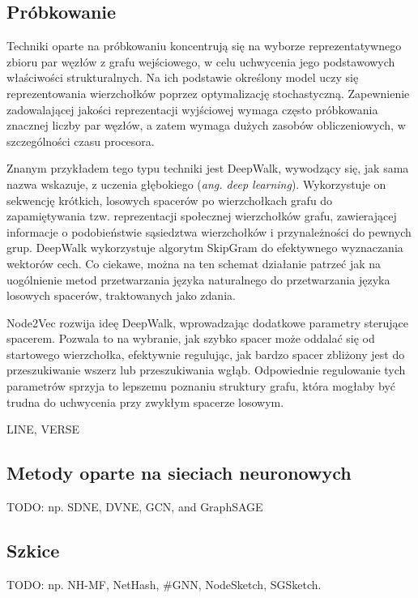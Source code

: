     \subsection{Próbkowanie}
        Techniki oparte na próbkowaniu koncentrują się na wyborze reprezentatywnego zbioru par węzłów z grafu wejściowego, w celu uchwycenia jego podstawowych właściwości strukturalnych. Na ich podstawie określony model uczy się reprezentowania wierzchołków poprzez optymalizację stochastyczną. Zapewnienie zadowalającej jakości reprezentacji wyjściowej wymaga często próbkowania znacznej liczby par węzłów, a zatem wymaga dużych zasobów obliczeniowych, w szczególności czasu procesora.
            
        Znanym przykładem tego typu techniki jest DeepWalk\cite{Perozzi_Al-Rfou_Skiena_2014}, wywodzący się, jak sama nazwa wskazuje, z uczenia głębokiego (\emph{ang. deep learning}). Wykorzystuje on sekwencję krótkich, losowych spacerów po wierzchołkach grafu do zapamiętywania tzw. reprezentacji społecznej wierzchołków grafu, zawierającej informacje o podobieństwie sąsiedztwa wierzchołków i przynależności do pewnych grup. DeepWalk wykorzystuje algorytm SkipGram do efektywnego wyznaczania wektorów cech. Co ciekawe, można na ten schemat działanie patrzeć jak na uogólnienie metod przetwarzania języka naturalnego do przetwarzania języka losowych spacerów, traktowanych jako zdania. 
        
        Node2Vec\cite{Grover_Leskovec_2016} rozwija ideę DeepWalk, wprowadzając dodatkowe parametry sterujące spacerem. Pozwala to na wybranie, jak szybko spacer może oddalać się od startowego wierzchołka, efektywnie regulując, jak bardzo spacer zbliżony jest do przeszukiwanie wszerz lub przeszukiwania wgłąb. Odpowiednie regulowanie tych parametrów sprzyja to lepszemu poznaniu struktury grafu, która mogłaby być trudna do uchwycenia przy zwykłym spacerze losowym. 
        
        LINE\cite{Tang_Qu_Wang_Zhang_Yan_Mei_2015}, VERSE\cite{Tsitsulin_Mottin_Karras_Müller_2018} 

    \subsection{Metody oparte na sieciach neuronowych}
        TODO: np. SDNE\cite{Wang_Cui_Zhu_2016}, DVNE\cite{Zhu_Cui_Wang_Zhu_2018}, GCN\cite{DBLP:journals/corr/KipfW16}, and GraphSAGE\cite{DBLP:journals/corr/HamiltonYL17} 

    \subsection{Szkice}
        TODO: np. NH-MF, NetHash, \#GNN, NodeSketch\cite{Yang_Rosso_Li_Cudre-Mauroux_2019}, SGSketch\cite{Yang_Qu_Yang_Wang_Cudre-Mauroux_2022}.

